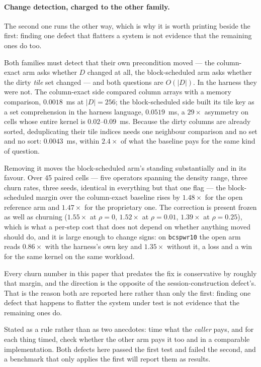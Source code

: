 \documentclass{article}
\begin{document}
\paragraph{Change detection, charged to the other family.}
The second one runs the other way, which is why it is worth printing beside the
first: finding one defect that flatters a system is not evidence that the
remaining ones do too.

Both families must detect that their own precondition moved --- the column-exact
arm asks whether $D$ changed at all, the block-scheduled arm asks whether the
dirty \emph{tile} set changed --- and both questions are $O(|D|)$. In the harness
they were not. The column-exact side compared column arrays with a memory
comparison, $0.0018$~ms at $|D|{=}256$; the block-scheduled side built its tile
key as a set comprehension in the harness language, $0.0519$~ms, a $29\times$
asymmetry on cells whose entire kernel is $0.02$--$0.09$~ms. Because the dirty
columns are already sorted, deduplicating their tile indices needs one neighbour
comparison and no set and no sort: $0.0043$~ms, within $2.4\times$ of what the
baseline pays for the same kind of question.

Removing it moves the block-scheduled arm's standing substantially and in its
favour. Over 45 paired cells --- five operators spanning the density range,
three churn rates, three seeds, identical in everything but that one flag --- the
block-scheduled margin over the column-exact baseline rises by $1.48\times$ for
the open reference arm and $1.47\times$ for the proprietary one. The correction
is present frozen as well as churning ($1.55\times$ at $\rho{=}0$, $1.52\times$
at $\rho{=}0.01$, $1.39\times$ at $\rho{=}0.25$), which is what a per-step cost
that does not depend on whether anything moved should do, and it is large enough
to change signs: on \texttt{bcspwr10} the open arm reads $0.86\times$ with the
harness's own key and $1.35\times$ without it, a loss and a win for the same
kernel on the same workload.

Every churn number in this paper that predates the fix is conservative by
roughly that margin, and the direction is the opposite of the
session-construction defect's. That is the reason both are reported here rather
than only the first: finding one defect that happens to flatter the system under
test is not evidence that the remaining ones do.

Stated as a rule rather than as two anecdotes: time what the \emph{caller} pays,
and for each thing timed, check whether the other arm pays it too and in a
comparable implementation. Both defects here passed the first test and failed
the second, and a benchmark that only applies the first will report them as
results.
\end{document}
